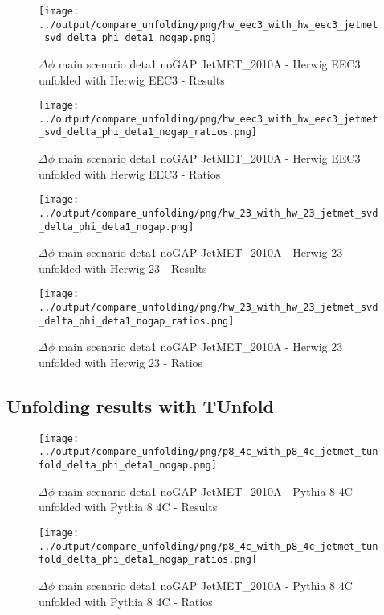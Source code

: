 \documentclass[11pt]{book}
\begin{document}
\begin{figure}[ht]
\centering
\texttt{[image: ../output/compare\_unfolding/png/hw\_eec3\_with\_hw\_eec3\_jetmet\_svd\_delta\_phi\_deta1\_nogap.png]}
\caption{$\Delta\phi$ main scenario deta1 noGAP JetMET\_2010A - Herwig EEC3 unfolded with Herwig EEC3 - Results}
\label{hw_eec3_hw_eec3_jetmet_svd_delta_phi_deta1_nogap_a}
\end{figure}

\begin{figure}[ht]
\centering
\texttt{[image: ../output/compare\_unfolding/png/hw\_eec3\_with\_hw\_eec3\_jetmet\_svd\_delta\_phi\_deta1\_nogap\_ratios.png]}
\caption{$\Delta\phi$ main scenario deta1 noGAP JetMET\_2010A - Herwig EEC3 unfolded with Herwig EEC3 - Ratios}
\label{hw_eec3_hw_eec3_jetmet_svd_delta_phi_deta1_nogap_b}
\end{figure}

\begin{figure}[ht]
\centering
\texttt{[image: ../output/compare\_unfolding/png/hw\_23\_with\_hw\_23\_jetmet\_svd\_delta\_phi\_deta1\_nogap.png]}
\caption{$\Delta\phi$ main scenario deta1 noGAP JetMET\_2010A - Herwig 23 unfolded with Herwig 23 - Results}
\label{hw_23_hw_23_jetmet_svd_delta_phi_deta1_nogap_a}
\end{figure}

\begin{figure}[ht]
\centering
\texttt{[image: ../output/compare\_unfolding/png/hw\_23\_with\_hw\_23\_jetmet\_svd\_delta\_phi\_deta1\_nogap\_ratios.png]}
\caption{$\Delta\phi$ main scenario deta1 noGAP JetMET\_2010A - Herwig 23 unfolded with Herwig 23 - Ratios}
\label{hw_23_hw_23_jetmet_svd_delta_phi_deta1_nogap_b}
\end{figure}


\clearpage
\subsection{Unfolding results with TUnfold}

\begin{figure}[ht]
\centering
\texttt{[image: ../output/compare\_unfolding/png/p8\_4c\_with\_p8\_4c\_jetmet\_tunfold\_delta\_phi\_deta1\_nogap.png]}
\caption{$\Delta\phi$ main scenario deta1 noGAP JetMET\_2010A - Pythia 8 4C unfolded with Pythia 8 4C - Results}
\label{p8_p8_jetmet_tunfold_delta_phi_deta1_nogap_a}
\end{figure}

\begin{figure}[ht]
\centering
\texttt{[image: ../output/compare\_unfolding/png/p8\_4c\_with\_p8\_4c\_jetmet\_tunfold\_delta\_phi\_deta1\_nogap\_ratios.png]}
\caption{$\Delta\phi$ main scenario deta1 noGAP JetMET\_2010A - Pythia 8 4C unfolded with Pythia 8 4C - Ratios}
\label{p8_p8_jetmet_tunfold_delta_phi_deta1_nogap_b}
\end{figure}
\end{document}
